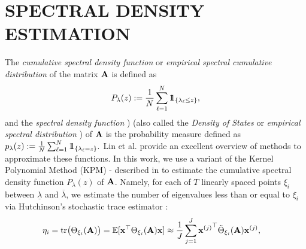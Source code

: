 \documentclass{article}
\begin{document}
\section{SPECTRAL DENSITY ESTIMATION}
The \emph{cumulative spectral density function} or \emph{empirical spectral cumulative distribution} of the matrix ${\bf A}$ is defined as 
\begin{align} \label{Eq:cdf}
P_{\lambda}(z):=\frac{1}{N}\sum_{\ell=1}^{N} 1\!\!1_{\left\{\lambda_{\ell}\leq z\right\}},
\end{align}
and the \emph{spectral density function} \cite[Chapter 6]{van_mieghem}) (also called the \emph{Density of States} or \emph{empirical spectral distribution} \cite[Chapter 2.4]{tao_random_matrix}) of ${\bf A}$ is the probability measure defined as 
$p_{\lambda}(z):=\frac{1}{N}\sum_{\ell=1}^{N} 1\!\!1_{\left\{\lambda_{\ell}=z\right\}}.$
Lin et al. \cite{lin_spectral_density} provide an excellent overview of methods to approximate these functions. In this work, we use a variant of the Kernel Polynomial Method (KPM) \cite{silver1994densities}\nocite{silver1996kernel}-\cite{wang1994calculating} described in \cite{lin_spectral_density,mcsfb} to estimate the cumulative spectral density function $P_{\lambda}(z)$ of ${\bf A}$. Namely, for each of $T$ linearly spaced points $\xi_i$ between $\underline{\lambda}$ and $\overline{\lambda}$, we estimate the number of eigenvalues less than or equal to $\xi_i$ via Hutchinson's stochastic trace estimator \cite{hutchinson}:
\begin{align}\label{Eq:eig_count}
\eta_i =\mbox{tr}\bigl(\Theta_{\xi_i}({\bf A})\bigr)
=\mathbb{E}[{\bf x}^{\top}\Theta_{\xi_i}({\bf A}){\bf x}]   
&\approx \frac{1}{J} \sum_{j=1}^J {{\bf x}^{(j)}}^{\top}\tilde{\Theta}_{\xi_i}({\bf A}){\bf x}^{(j)},
\end{align}
\end{document}
